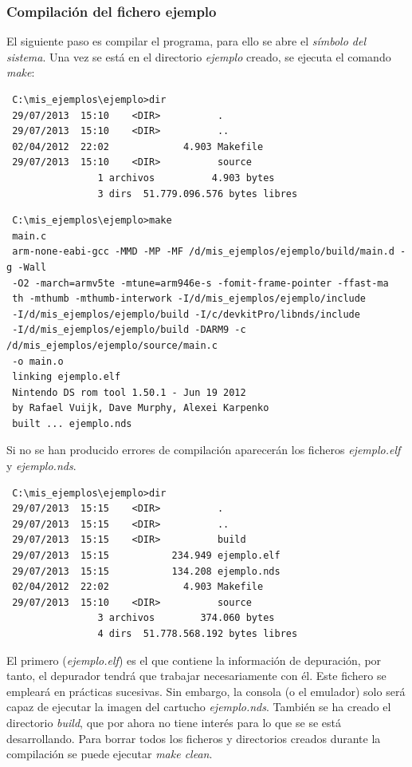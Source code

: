 \subsubsection{Compilación del fichero ejemplo}
El siguiente paso es compilar el programa, para ello se abre el \textit{símbolo del sistema}. Una vez se está en el directorio \textit{ejemplo} creado, se ejecuta el comando \textit{make}:

{\scriptsize
\begin{verbatim}
 C:\mis_ejemplos\ejemplo>dir
 29/07/2013  15:10    <DIR>          .
 29/07/2013  15:10    <DIR>          ..
 02/04/2012  22:02             4.903 Makefile
 29/07/2013  15:10    <DIR>          source
                1 archivos          4.903 bytes
                3 dirs  51.779.096.576 bytes libres
 \end{verbatim}
}

{\scriptsize
\begin{verbatim}
 C:\mis_ejemplos\ejemplo>make
 main.c
 arm-none-eabi-gcc -MMD -MP -MF /d/mis_ejemplos/ejemplo/build/main.d -g -Wall 
 -O2 -march=armv5te -mtune=arm946e-s -fomit-frame-pointer -ffast-ma
 th -mthumb -mthumb-interwork -I/d/mis_ejemplos/ejemplo/include
 -I/d/mis_ejemplos/ejemplo/build -I/c/devkitPro/libnds/include 
 -I/d/mis_ejemplos/ejemplo/build -DARM9 -c /d/mis_ejemplos/ejemplo/source/main.c 
 -o main.o
 linking ejemplo.elf
 Nintendo DS rom tool 1.50.1 - Jun 19 2012
 by Rafael Vuijk, Dave Murphy, Alexei Karpenko
 built ... ejemplo.nds
\end{verbatim}
}

Si no se han producido errores de compilación aparecerán los ficheros  \textit{ejemplo.elf} y \textit{ejemplo.nds}.

{\scriptsize
 \begin{verbatim}
 C:\mis_ejemplos\ejemplo>dir
 29/07/2013  15:15    <DIR>          .
 29/07/2013  15:15    <DIR>          ..
 29/07/2013  15:15    <DIR>          build
 29/07/2013  15:15           234.949 ejemplo.elf
 29/07/2013  15:15           134.208 ejemplo.nds
 02/04/2012  22:02             4.903 Makefile
 29/07/2013  15:10    <DIR>          source
                3 archivos        374.060 bytes
                4 dirs  51.778.568.192 bytes libres
 \end{verbatim}
}

El primero (\textit{ejemplo.elf}) es el que contiene la información de depuración, por tanto, el depurador tendrá que trabajar necesariamente con él. Este fichero se empleará en prácticas sucesivas. Sin embargo,  la consola (o el emulador) solo será capaz de ejecutar la imagen del cartucho \textit{ejemplo.nds}. También se ha creado el directorio \textit{build}, que por ahora no tiene interés para lo que se  se está desarrollando. Para borrar todos los ficheros y directorios creados durante la compilación se puede ejecutar \textit{make clean}.

